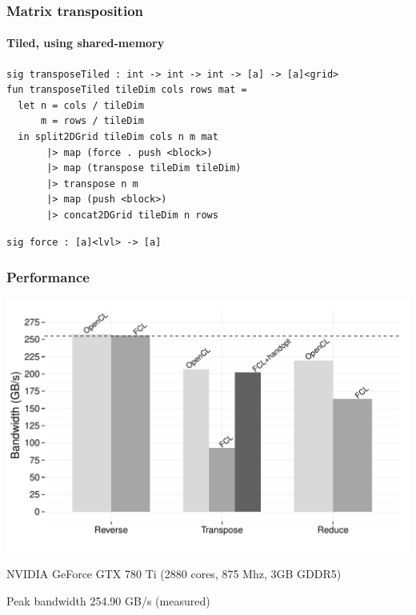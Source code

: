 \documentclass{beamer}
\begin{document}
\begin{frame}[fragile]
\end{frame}



\begin{frame}
\frametitle{Matrix transposition}
\framesubtitle{Tiled, using shared-memory}

{\small
\begin{verbatim}
sig transposeTiled : int -> int -> int -> [a] -> [a]<grid>
fun transposeTiled tileDim cols rows mat =
  let n = cols / tileDim
      m = rows / tileDim
  in split2DGrid tileDim cols n m mat
       |> map (force . push <block>)
       |> map (transpose tileDim tileDim)
       |> transpose n m
       |> map (push <block>)
       |> concat2DGrid tileDim n rows
\end{verbatim}
}

\begin{verbatim}
sig force : [a]<lvl> -> [a]
\end{verbatim}

\end{frame}

\begin{frame}
  \frametitle{Performance}
  \includegraphics[width=\textwidth]{../bandwidth}

  NVIDIA GeForce GTX 780 Ti (2880 cores, 875 Mhz, 3GB GDDR5)
  
  Peak bandwidth 254.90 GB/s (measured)
\end{frame}
\end{document}
